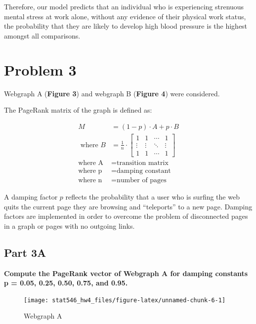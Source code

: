 \documentclass[]{article}
\begin{document}
Therefore, our model predicts that an individual who is experiencing
strenuous mental stress at work alone, without any evidence of their
physical work status, the probability that they are likely to develop
high blood pressure is the highest amongst all comparisons.

\clearpage

\section{Problem 3}\label{problem-3}

Webgraph A (\textbf{Figure 3}) and webgraph B (\textbf{Figure 4}) were
considered.

The PageRank matrix of the graph is defined as:

\begin{align*}
M &= (1-p) \cdot A + p \cdot B \\
\text{ where } B &= \frac{1}{n} \cdot \begin{bmatrix}
 1      & 1      & \cdots & 1\\
 \vdots & \vdots & \ddots & \vdots \\
 1      & 1      & \cdots & 1
\end{bmatrix} \\
\text{where A} &= \text{transition matrix} \\
\text{where p} &= \text{damping constant} \\
\text{where n} &= \text{number of pages}
\end{align*}

A damping factor \(p\) reflects the probability that a user who is
surfing the web quits the current page they are browsing and
``teleports'' to a new page. Damping factors are implemented in order to
overcome the problem of disconnected pages in a graph or pages with no
outgoing links.

\subsection{Part 3A}\label{part-3a}

\textbf{Compute the PageRank vector of Webgraph A for damping constants
p = 0.05, 0.25, 0.50, 0.75, and 0.95.}

\begin{figure}[h]

{\centering \texttt{[image: stat546\_hw4\_files/figure-latex/unnamed-chunk-6-1]} 

}

\caption{Webgraph A}\label{fig:unnamed-chunk-6}
\end{figure}
\end{document}
